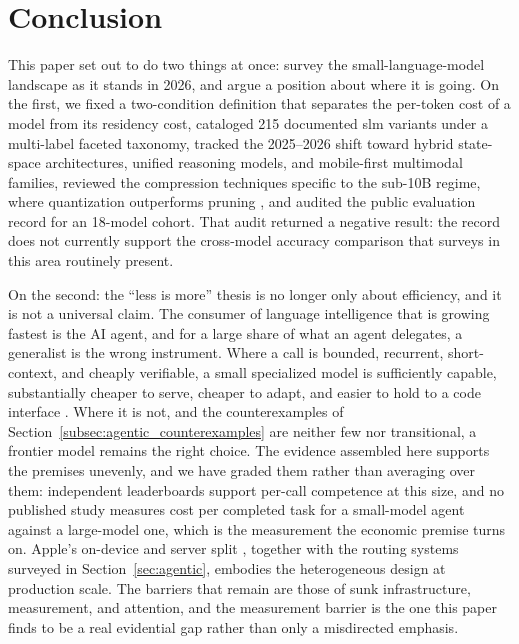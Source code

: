 \section{Conclusion}
\label{section:conclusion}

This paper set out to do two things at once: survey the small-language-model
landscape as it stands in 2026, and argue a position about where it is going. On
the first, we fixed a two-condition definition that separates the per-token cost
of a model from its residency cost, cataloged 215 documented \gls{slm} variants
under a multi-label faceted taxonomy, tracked the 2025--2026 shift toward hybrid
state-space architectures, unified reasoning models, and mobile-first multimodal
families, reviewed the compression techniques specific to the sub-10B regime,
where quantization outperforms pruning \citep{kurz2025pruning_vs_quant}, and
audited the public evaluation record for an 18-model cohort. That audit returned
a negative result: the record does not currently support the cross-model accuracy
comparison that surveys in this area routinely present.

On the second: the ``less is more'' thesis is no longer only about efficiency,
and it is not a universal claim. The consumer of language intelligence that is
growing fastest is the AI agent, and for a large share of what an agent
delegates, a generalist is the wrong instrument. Where a call is bounded,
recurrent, short-context, and cheaply verifiable, a small specialized model is
sufficiently capable, substantially cheaper to serve, cheaper to adapt, and
easier to hold to a code interface \citep{belcak2025slm_agentic}. Where it is
not, and the counterexamples of
Section~\ref{subsec:agentic_counterexamples} are neither few nor transitional,
a frontier model remains the right choice. The evidence assembled here supports
the premises unevenly, and we have graded them rather than averaging over them:
independent leaderboards support per-call competence at this size, and no
published study measures cost per completed task for a small-model agent against
a large-model one, which is the measurement the economic premise turns on. Apple's
on-device and server split \citep{gunter2025afm}, together with the routing
systems surveyed in Section~\ref{sec:agentic}, embodies the heterogeneous design
at production scale.
The barriers that remain are those of sunk infrastructure, measurement, and
attention, and the measurement barrier is the one this paper finds to be a real
evidential gap rather than only a misdirected emphasis.

